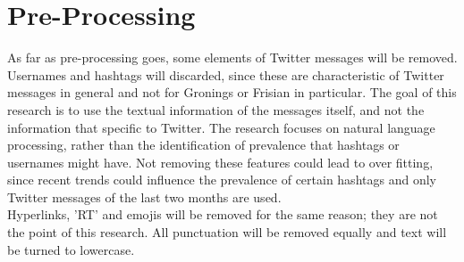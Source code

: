 \documentclass[
10pt, %
a4paper, %
oneside, %
headinclude,footinclude, %
] {book}%
\begin{document}
\section{Pre-Processing}
As far as pre-processing goes, some elements of Twitter messages will be removed. Usernames and hashtags will discarded, since these are characteristic of Twitter messages in general and not for Gronings or Frisian in particular. The goal of this research is to use the textual information of the messages itself, and not the information that specific to Twitter. The research focuses on natural language processing, rather than the identification of prevalence that hashtags or usernames might have. Not removing these features could lead to over fitting, since recent trends could influence the prevalence of certain hashtags and only Twitter messages of the last two months are used. \\
Hyperlinks, 'RT' and emojis will be removed for the same reason; they are not the point of this research. All punctuation will be removed equally and text will be turned to lowercase.
\end{document}
